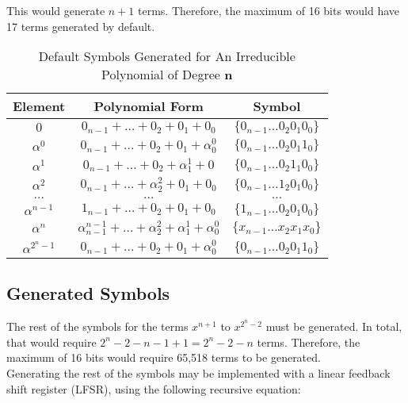 \documentclass[paper=usletter, fontsize=12pt]{article}
\begin{document}
        This would generate $n+1$ terms. Therefore, the maximum of 16 bits would have 17 terms generated by default.

       \begin{table}[h]
            \def\arraystretch{2.5}
            \caption{Default Symbols Generated for An Irreducible Polynomial of Degree $\bm{n}$}
            \centering
            \begin{tabular*}{300pt}{@{\extracolsep{\fill}} ccc}

            \textbf{Element} & \textbf{Polynomial Form} & \textbf{Symbol} \\
            \hline
            $0$                 & $0_{n-1} + \ldots + 0_{2} + 0_{1} + 0_{0}$                                           & $\{0_{n-1}\ldots0_{2}0_{1}0_{0}\}$  \\
            $\alpha^{0}$        & $0_{n-1} + \ldots + 0_{2} + 0_{1} + \alpha^{0}_{0}$                                  & $\{0_{n-1}\ldots0_{2}0_{1}1_{0}\}$ \\
            $\alpha^{1}$        & $0_{n-1} + \ldots + 0_{2} + \alpha^{1}_{1} + 0$                                      & $\{0_{n-1}\ldots0_{2}1_{1}0_{0}\}$ \\
            $\alpha^{2}$        & $0_{n-1} + \ldots + \alpha^{2}_{2} + 0_{1} + 0_{0}$                                  & $\{0_{n-1}\ldots1_{2}0_{1}0_{0}\}$ \\
            $\ldots$            & $\ldots$                                                                             & $\ldots$ \\
            $\alpha^{n-1}$      & $1_{n-1} + \ldots + 0_{2} + 0_{1} + 0_{0}$                                           & $\{1_{n-1}\ldots 0_{2}0_{1}0_{0}\}$ \\
            $\alpha^{n}$        & $\alpha^{n-1}_{n-1} + \ldots + \alpha^{2}_{2} + \alpha^{1}_{1} + \alpha^{0}_{0}$     & $\{x_{n-1}\ldots x_{2}x_{1}x_{0}\}$ \\
            $\alpha^{2^{n}-1}$  & $0_{n-1} + \ldots + 0_{2} + 0_{1} + \alpha^{0}_{0}$                                  & $\{0_{n-1}\ldots0_{2}0_{1}1_{0}\}$ \\
            \end{tabular*}
        \end{table}
        \newpage

        \subsection{Generated Symbols}
        The rest of the symbols for the terms $x^{n+1}$ to $x^{2^{n}-2}$ must be generated. In total, that would require $2^{n}-2-n-1+1=2^{n}-2-n$ terms. Therefore, the maximum of 16 bits would require 65,518 terms to be generated. \\
        Generating the rest of the symbols may be implemented with a linear feedback shift register (LFSR), using the following recursive equation: \\
\end{document}
